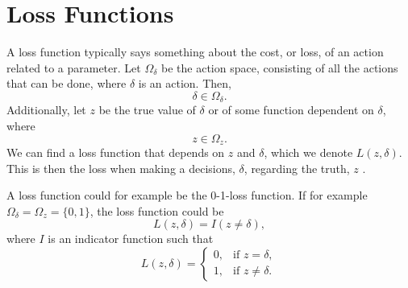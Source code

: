 \section{Loss Functions}
\label{theory_loss_functions}
A loss function typically says something about the cost, or loss, of an action related to a parameter. Let $\Omega_{\delta}$ be the action space, consisting of all the actions that can be done, where $\delta$ is an action. Then,
\begin{equation*}
    \delta \in \Omega_{\delta}.
\end{equation*}
Additionally, let $z$ be the true value of $\delta$ or of some function dependent on $\delta$, where 
\begin{equation*}
    z \in \Omega_z.
\end{equation*} 
We can find a loss function that depends on $z$ and $\delta$, which we denote $L(z,\delta)$. This is then the loss when making a decisions, $\delta$, regarding the truth, $z$ \citep{statisticalDecisionTheoryLiese2008}.

A loss function could for example be the 0-1-loss function. If for example $\Omega_{\delta}= \Omega_z = \{0,1\}$, the loss function could be
\begin{equation}
\label{loss_func_indicator}
    L(z,\delta) = I(z \neq \delta),
\end{equation}
where $I$ is an indicator function such that
\begin{equation*}
    L(z,\delta) =
    \begin{cases}
        0,&  \text{if } z = \delta, \\
        1,&  \text{if } z \neq \delta.
    \end{cases}
\end{equation*}


